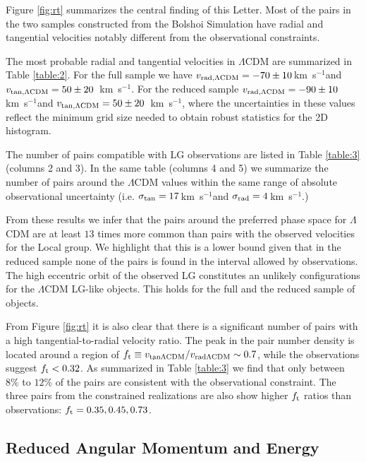 \documentclass{emulateapj}
\newcommand{\kms}{\,km~s$^{-1}$}
\begin{document}
Figure \ref{fig:rt} summarizes the central finding of this
Letter. Most of the pairs in the two samples constructed from the
Bolshoi Simulation have radial and tangential velocities notably
different from the observational constraints.   

The most probable radial and tangential velocities in $\Lambda$CDM are
summarized in Table \ref{table:2}. For the full sample we have $v_{\rm
  rad,\Lambda CDM} = -70\pm10$\kms and $v_{\rm tan,\Lambda CDM} =
50\pm20$ \kms. For the reduced sample $v_{\rm
  rad,\Lambda CDM} = -90\pm10$\kms and $v_{\rm tan,\Lambda CDM} =
50\pm20$ \kms, where the uncertainties in these values reflect
the minimum grid size needed to obtain robust statistics for the 2D
histogram. 

The number of pairs compatible with LG observations are listed in
Table \ref{table:3} (columns 2 and 3). In the same table (columns 4
and 5) we summarize the number of pairs around the $\Lambda$CDM values
within the same range of absolute observational uncertainty
(i.e. $\sigma_{\rm tan}=17$\kms and $\sigma_{\rm rad}=4$\kms.) 

From these results we infer that the pairs around the preferred phase
space for $\Lambda$CDM are at least $13$ times more common than pairs
with the observed velocities for the Local group. We highlight that
this is a lower bound given that in the reduced sample none of the
pairs is found in the interval allowed by observations. The high
eccentric orbit of the observed LG  constitutes an unlikely
configurations for the $\Lambda$CDM LG-like objects. This holds for
the full and the reduced sample of objects. 


From Figure \ref{fig:rt} it is also clear that there is a significant
number of pairs with a high tangential-to-radial velocity ratio. The
peak in the pair number density is located around a region of $f_{\rm
  t}\equiv v_{\rm tan \Lambda CDM}/v_{\rm rad \Lambda CDM}\sim 0.7$,
while the observations suggest $f_{\rm t}<0.32$. As summarized in Table
\ref{table:3} we find that only between $8\%$ to $12\%$ of the pairs are
consistent with the observational constraint. The three
pairs from the constrained realizations are also show higher $f_{\rm
  t}$ ratios than observations: $f_{\rm t}= 0.35, 0.45, 0.73$. 





\subsection{Reduced Angular Momentum and Energy}
\label{subsection:e-l}
\end{document}
